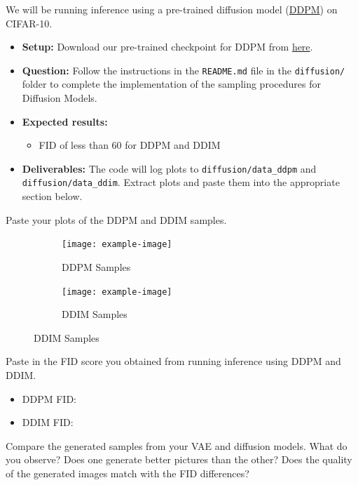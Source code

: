 \documentclass[11pt,addpoints,answers]{exam}
\numberwithin{equation}{section} %
\numberwithin{figure}{section} %
\numberwithin{table}{section} %
\begin{document}
We will be running inference using a pre-trained diffusion model (\href{https://arxiv.org/abs/2006.11239}{DDPM}) on CIFAR-10. 
\begin{itemize}
\item \textbf{Setup:} Download our pre-trained checkpoint for DDPM from \href{https://drive.google.com/file/d/1gtn9Jv9jBUol7iJw-94hw4j6KfpG3SZE/view?usp=sharing}{here}.
\item \textbf{Question:} Follow the instructions in the \texttt{README.md} file in the \texttt{diffusion/} folder to complete the implementation of the sampling procedures for Diffusion Models.
\item \textbf{Expected results:} 
    \begin{itemize}
        \item FID of less than 60 for DDPM and DDIM
    \end{itemize}
\item \textbf{Deliverables:} The code will log plots to \texttt{diffusion/data\_ddpm} and \texttt{diffusion/data\_ddim}. Extract plots and paste them into the appropriate section below. 
\end{itemize}
\begin{questions}
\question Paste your plots of the DDPM and DDIM samples.
\begin{solution}
\begin{figure}[H]
    \centering
    \begin{subfigure}[b]{0.48\linewidth}
        \texttt{[image: example-image]}
        \caption{DDPM Samples}
    \end{subfigure}
    \begin{subfigure}[b]{0.48\linewidth}
        \texttt{[image: example-image]}
        \caption{DDIM Samples}
    \end{subfigure}
\end{figure}
\end{solution}
\question Paste in the FID score you obtained from running inference using DDPM and DDIM.
\begin{solution}
\begin{itemize}
    \item DDPM FID:
    \item DDIM FID:
\end{itemize} 
\end{solution}
\question Compare the generated samples from your VAE and diffusion models. What do you observe? Does one generate better pictures than the other? Does the quality of the generated images match with the FID differences?
\begin{solution}
    \\
\end{solution}

\end{questions}
\end{document}
